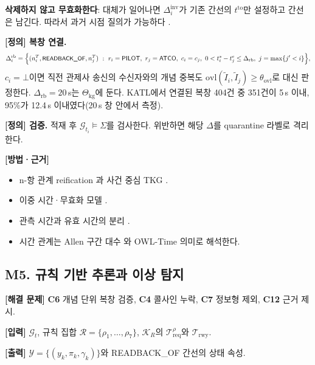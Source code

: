\documentclass[10pt,a4paper]{article}
\newcommand{\G}{\mathcal{G}}
\newcommand{\Treq}{\mathcal{T}_{\mathrm{req}}}
\newcommand{\Yset}{\mathcal{Y}}
\newcommand{\KR}{\mathcal{K}_R}
\newcommand{\Cfg}{\Theta_{\mathrm{kg}}}
\newcommand{\ATCO}{\textsf{ATCO}}
\newcommand{\PILOT}{\textsf{PILOT}}
\newcommand{\cmd}[1]{\textsf{\small #1}}
\newcommand{\ch}[1]{\textbf{\textcolor{red!60!black}{#1}}}
\begin{document}
\textbf{삭제하지 않고 무효화한다}: 대체가 일어나면 $\Delta^{\mathrm{inv}}_i$가 기존 간선의 $t^{\mathrm{to}}$만 설정하고 간선은 남긴다. 따라서 과거 시점 질의가 가능하다 \cite{zep2025}.

\textbf{[정의] 복창 연결.}
\begin{equation}
\Delta^{\mathrm{rb}}_i = \Big\{(n^T_i,\cmd{READBACK\_OF},n^T_j)\ :\ r_i=\PILOT,\ r_j=\ATCO,\ c_i=c_j,\ 0 < t^s_i - t^e_j \le \Delta_{\mathrm{rb}},\ j=\max\{j'<i\}\Big\},
\end{equation}
$c_i=\bot$이면 직전 관제사 송신의 수신자와의 개념 중복도 $\mathrm{ovl}(\tilde I_i,\tilde I_j)\ge\theta_{\mathrm{ovl}}$로 대신 판정한다. $\Delta_{\mathrm{rb}}=20$\,s는 $\Cfg$에 둔다. KATL에서 연결된 복창 404건 중 351건이 5\,s 이내, 95\%가 12.4\,s 이내였다(20\,s 창 안에서 측정).

\textbf{[정의] 검증.} 적재 후 $\G_{t_i}\models\Sigma$를 검사한다. 위반하면 해당 $\Delta$를 \cmd{quarantine} 라벨로 격리한다.

\textbf{[방법·근거]}
\begin{itemize}
\item n-항 관계 reification \cite{naryw3c}과 사건 중심 TKG \cite{knez2023}.
\item 이중 시간·무효화 모델 \cite{zep2025}.
\item 관측 시간과 유효 시간의 분리 \cite{atom2025}.
\item 시간 관계는 Allen 구간 대수 \cite{allen1983}와 OWL-Time \cite{owltime} 의미로 해석한다.
\end{itemize}

\subsection{M5. 규칙 기반 추론과 이상 탐지}
\textbf{[해결 문제]} \ch{C6} 개념 단위 복창 검증, \ch{C4} 콜사인 누락, \ch{C7} 정보형 제외, \ch{C12} 근거 제시.

\textbf{[입력]} $\G_{t}$, 규칙 집합 $\mathcal{R}=\{\rho_1,\dots,\rho_7\}$, $\KR$의 $\Treq^{\rho}$와 $\mathcal{T}_{\mathrm{rwy}}$.

\textbf{[출력]} $\Yset=\{(y_k,\pi_k,\gamma_k)\}$와 \cmd{READBACK\_OF} 간선의 상태 속성.
\end{document}
